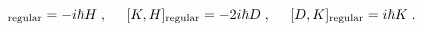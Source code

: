 \begin{equation}
[D,H]_{\rm regular}
= - i \hbar H
 \;  ,
\;
\;  \;   \;   \;
[K,H]_{\rm regular}  = - 2 i \hbar D
\;  ,
\;
\;  \;   \;   \;
[D, K]_{\rm regular}  =  i \hbar K
\;  .
\label{eq:naive_commutators}
\end{equation}

